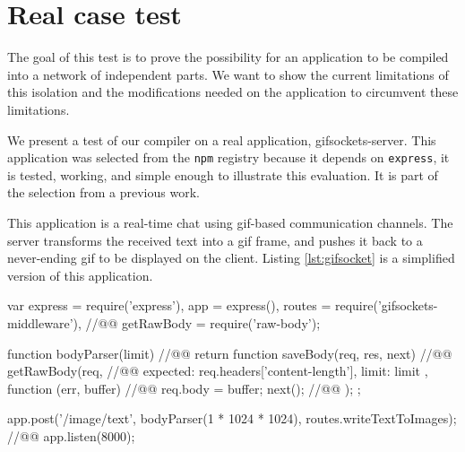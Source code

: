 \section{Real case test} \label{section:evaluation}

The goal of this test is to prove the possibility for an application to be compiled into a network of independent parts.
We want to show the current limitations of this isolation and the modifications needed on the application to circumvent these limitations.

We present a test of our compiler on a real application, gifsockets-server.
This application was selected from the \texttt{npm} registry because it depends on \texttt{express}, it is tested, working, and simple enough to illustrate this evaluation.
It is part of the selection from a previous work. %

This application is a real-time chat using gif-based communication channels.
The server transforms the received text into a gif frame, and pushes it back to a never-ending gif to be displayed on the client.
Listing \ref{lst:gifsocket} is a simplified version of this application.

\begin{code}[js, caption={Simplified version of gifsockets-server},label={lst:gifsocket}]
var express = require('express'),
    app = express(),
    routes = require('gifsockets-middleware'), //@\label{lst:gifsocket:gif-mw}@
    getRawBody = require('raw-body');

function bodyParser(limit) { //@\label{lst:gifsocket:bodyParser}@
  return function saveBody(req, res, next) { //@\label{lst:gifsocket:saveBody}@
    getRawBody(req, { //@\label{lst:gifsocket:getRawBody}@
      expected: req.headers['content-length'],
      limit: limit
    }, function (err, buffer) { //@\label{lst:gifsocket:callback}@
      req.body = buffer;
      next(); //@\label{lst:gifsocket:next}@
    });
  };
}

app.post('/image/text', bodyParser(1 * 1024 * 1024), routes.writeTextToImages); //@\label{lst:gifsocket:app.post}@
app.listen(8000);
\end{code}

